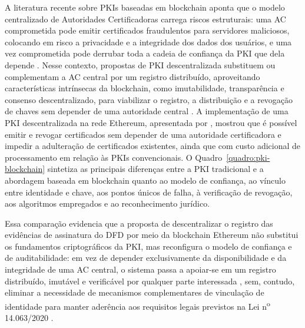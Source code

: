 \documentclass[
    12pt,
    a4paper,
    oneside,
    chapter=TITLE,
    section=TITLE,
    subsection=TITLE,
    subsubsection=TITLE,
    sumario=tradicional,
    english,
    brazil
]{abntex2}
\begin{document}
A literatura recente sobre PKIs baseadas em blockchain aponta que o
modelo centralizado de Autoridades Certificadoras carrega riscos
estruturais: uma AC comprometida pode emitir certificados fraudulentos
para servidores maliciosos, colocando em risco a privacidade e a
integridade dos dados dos usuários, e uma vez comprometida pode
derrubar toda a cadeia de confiança da PKI que dela depende
\cite{halder2024}. Nesse contexto, propostas de PKI
descentralizada substituem ou complementam a AC central por um
registro distribuído, aproveitando características intrínsecas da
blockchain, como imutabilidade, transparência e consenso descentralizado,
para viabilizar o registro, a distribuição e a revogação de
chaves sem depender de uma autoridade central \cite{halder2024}.
A implementação de uma PKI descentralizada na rede Ethereum,
apresentada por , mostrou que é possível
emitir e revogar certificados sem depender de uma autoridade
certificadora e impedir a adulteração de certificados existentes,
ainda que com custo adicional de processamento em relação às PKIs
convencionais. O
Quadro~\ref{quadro:pki-blockchain} sintetiza as principais diferenças
entre a PKI tradicional e a abordagem baseada em blockchain quanto ao
modelo de confiança, ao vínculo entre identidade e chave, aos pontos
únicos de falha, à verificação de revogação, aos algoritmos empregados
e ao reconhecimento jurídico.

Essa comparação evidencia que a proposta de descentralizar o registro
das evidências de assinatura do DFD por meio da blockchain Ethereum
não substitui os fundamentos criptográficos da PKI, mas reconfigura o
modelo de confiança e de auditabilidade: em vez de depender
exclusivamente da disponibilidade e da integridade de uma AC central,
o sistema passa a apoiar-se em um registro distribuído, imutável e
verificável por qualquer parte interessada \cite{halder2024}, sem,
contudo, eliminar a necessidade de mecanismos
complementares de vinculação de identidade para manter aderência aos
requisitos legais previstos na Lei n\textsuperscript{o} 14.063/2020
\cite{brasil2020}.
\end{document}
